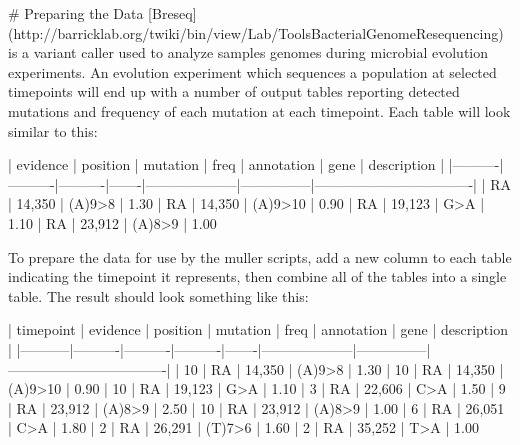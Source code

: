  # Preparing the Data
[Breseq](http://barricklab.org/twiki/bin/view/Lab/ToolsBacterialGenomeResequencing) is a variant caller used to analyze samples genomes during microbial evolution experiments. An evolution experiment which sequences a population at selected timepoints will end up with a number of output tables reporting detected mutations and frequency of each mutation at each timepoint. Each table will look similar to this:


| evidence | position | mutation | freq  | annotation         | gene          | description                      |
|----------|----------|----------|-------|--------------------|---------------|----------------------------------|
| RA       | 14,350   | (A)9>8   | 1.30%
| RA       | 14,350   | (A)9>10  | 0.90%
| RA       | 19,123   | G>A      | 1.10%
| RA       | 23,912   | (A)8>9   | 1.00%


To prepare the data for use by the muller scripts, add a new column to each table indicating the timepoint it represents, then combine all of the tables into a single table. The result should look something like this:

| timepoint | evidence | position | mutation | freq  | annotation         | gene          | description                      |
|-----------|----------|----------|----------|-------|--------------------|---------------|----------------------------------|
| 10        | RA       | 14,350   | (A)9>8   | 1.30%
| 10        | RA       | 14,350   | (A)9>10  | 0.90%
| 10        | RA       | 19,123   | G>A      | 1.10%
| 3         | RA       | 22,606   | C>A      | 1.50%
| 9         | RA       | 23,912   | (A)8>9   | 2.50%
| 10        | RA       | 23,912   | (A)8>9   | 1.00%
| 6         | RA       | 26,051   | C>A      | 1.80%
| 2         | RA       | 26,291   | (T)7>6   | 1.60%
| 2         | RA       | 35,252   | T>A      | 1.00%


